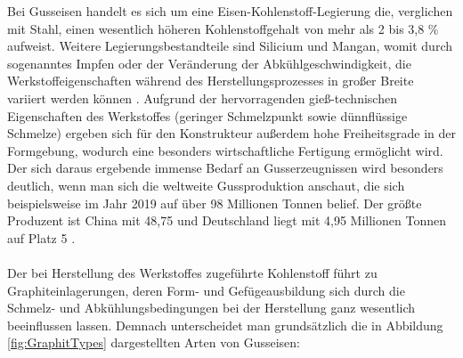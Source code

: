 \documentclass[
fontsize=10pt, 
listof = totoc,
parskip = half	
]{report}
\begin{document}
Bei Gusseisen handelt es sich um eine Eisen-Kohlenstoff-Legierung die, verglichen mit Stahl, einen wesentlich höheren Kohlenstoffgehalt von mehr als 2 bis 3,8 \% aufweist. Weitere Legierungsbestandteile sind Silicium und Mangan, womit durch sogenanntes Impfen oder der Veränderung der Abkühlgeschwindigkeit, die Werkstoffeigenschaften während des Herstellungsprozesses in großer Breite variiert werden können \cite{BDGuss02}. Aufgrund der hervorragenden gieß-technischen Eigenschaften des Werkstoffes (geringer Schmelzpunkt sowie dünnflüssige Schmelze) ergeben sich für den Konstrukteur außerdem hohe Freiheitsgrade in der Formgebung, wodurch eine besonders wirtschaftliche Fertigung ermöglicht wird. Der sich daraus ergebende immense Bedarf an Gusserzeugnissen wird besonders deutlich, wenn man sich die weltweite Gussproduktion anschaut, die sich beispielsweise im Jahr 2019 auf über 98 Millionen Tonnen belief. Der größte Produzent ist China mit 48,75 und Deutschland liegt mit 4,95 Millionen Tonnen auf Platz 5 \cite{Statista2021}.
\\\\
Der bei Herstellung des Werkstoffes zugeführte Kohlenstoff führt zu Graphiteinlagerungen, deren Form- und Gefügeausbildung sich durch die Schmelz- und Abkühlungsbedingungen bei der Herstellung ganz wesentlich beeinflussen lassen. Demnach unterscheidet man grundsätzlich die in Abbildung \ref{fig:GraphitTypes} dargestellten Arten von Gusseisen:
\end{document}
